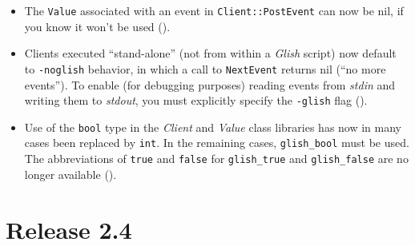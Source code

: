 \begin{itemize}
\item The \texttt{Value} associated with an event in \texttt{Client::PostEvent}
can now be nil, if you know it won't be used ().

\item Clients executed ``stand-alone'' (not from within a \emph{Glish} script)
now default to \texttt{-noglish} behavior, in which a call to \texttt{NextEvent}
returns nil (``no more events'').  To enable (for debugging purposes) reading
events from \emph{stdin} and writing them to \emph{stdout}, you must explicitly
specify the \texttt{-glish} flag ().

\item Use of the \texttt{bool} type in the \emph{Client} and \emph{Value}
class libraries has now in many cases been replaced by \texttt{int}.  In
the remaining cases, \texttt{glish\_bool} must be used.  The abbreviations
of \texttt{true} and \texttt{false} for \texttt{glish\_true} and \texttt{glish\_false}
are no longer available ().

\end{itemize}


\section{Release 2.4}

